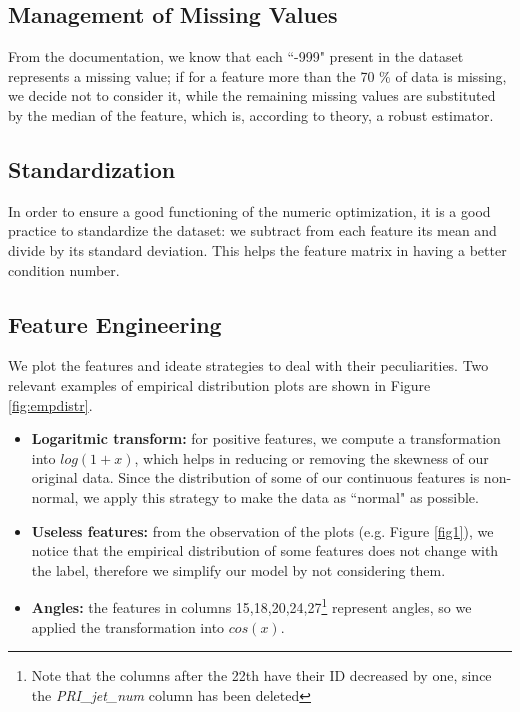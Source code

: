 \documentclass[10pt,conference,compsocconf]{IEEEtran}
\begin{document}
\subsection{Management of Missing Values}
From the documentation, we know that each ``-999" present in the dataset represents a missing value; if for a feature more than the 70 \% of data is missing, we decide not to consider it, while the remaining missing values are substituted by the median of the feature, which is, according to theory, a robust estimator.

\subsection{Standardization}
In order to ensure a good functioning of the numeric optimization, it is a good practice to standardize the dataset: we subtract from each feature its mean and divide by its standard deviation.
This helps the feature matrix in having a better condition number.

\subsection{Feature Engineering}
We plot the features and ideate strategies to deal with their peculiarities.
Two relevant examples of empirical distribution plots are shown in Figure \ref{fig:empdistr}.

\begin{itemize}
    \item \textbf{Logaritmic transform:} for positive features, we compute a transformation into $log(1+x)$, which helps in reducing or removing the skewness of our original data. Since the distribution of some of our continuous features is non-normal, we apply this strategy to make the data as ``normal" as possible. 
    \item \textbf{Useless features:} from the observation of the plots (e.g. Figure \ref{fig1}), we notice that the empirical distribution of some features does not change with the label, therefore we simplify our model by not considering them.
    \item \textbf{Angles:} the features in columns 15,18,20,24,27\footnote{Note that the columns after the 22th have their ID decreased by one, since the \emph{PRI\_jet\_num} column has been deleted} represent angles, so we applied the transformation into $cos(x)$.
\end{itemize}
\end{document}
